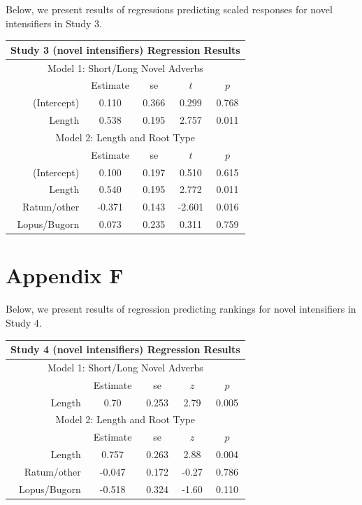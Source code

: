 \vspace{4mm}

Below, we present results of regressions predicting scaled responses for novel intensifiers in Study 3.

\vspace{4mm}

\noindent
\footnotesize{
\begin{tabular}{r|cccc}
\hline
\hline
\multicolumn{5}{c}{\textbf{Study 3 (novel intensifiers) Regression Results}} \\
\hline
\hline
\multicolumn{5}{c}{Model 1: Short/Long Novel Adverbs} \\
& Estimate & se & $t$ & $p$ \\
\hline
(Intercept) &  0.110 & 0.366 & 0.299 & 0.768 \\
Length &  0.538 & 0.195 & 2.757 & 0.011 \\
\hline
\hline
\multicolumn{5}{c}{Model 2: Length and Root Type} \\
& Estimate & se & $t$ & $p$ \\
\hline
(Intercept) & 0.100  & 0.197 & 0.510 & 0.615 \\
Length & 0.540  & 0.195 &   2.772 & 0.011 \\
Ratum/other & -0.371  & 0.143 &  -2.601 & 0.016 \\
Lopus/Bugorn &  0.073  & 0.235 &   0.311 & 0.759 \\
\hline
\hline
\end{tabular}
}

\section{Appendix F}

Below, we present results of regression predicting rankings for novel intensifiers in Study 4.

\vspace{4mm}

\noindent
\footnotesize{
\begin{tabular}{r|cccc}
\hline
\hline
\multicolumn{5}{c}{\textbf{Study 4 (novel intensifiers) Regression Results}} \\
\hline
\hline
\multicolumn{5}{c}{Model 1: Short/Long Novel Adverbs} \\
& Estimate & se & $z$ & $p$ \\
\hline
Length & 0.70 & 0.253 & 2.79 & 0.005 \\
\hline
\hline
\multicolumn{5}{c}{Model 2: Length and Root Type} \\
& Estimate & se & $z$ & $p$ \\
\hline
Length       &  0.757 & 0.263 &  2.88 & 0.004 \\
Ratum/other  & -0.047 & 0.172 & -0.27 & 0.786 \\ 
Lopus/Bugorn & -0.518 & 0.324 & -1.60 & 0.110 \\
\hline
\hline
\end{tabular}
} 


